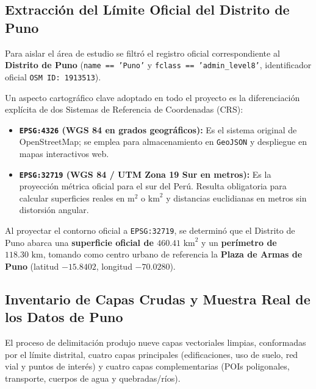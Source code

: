 \documentclass[11pt,a4paper]{article}
\begin{document}
\subsection{Extracción del Límite Oficial del Distrito de Puno}

Para aislar el área de estudio se filtró el registro oficial correspondiente al \textbf{Distrito de Puno} (\texttt{name == 'Puno'} y \texttt{fclass == 'admin\_level8'}, identificador oficial \texttt{OSM ID: 1913513}).

Un aspecto cartográfico clave adoptado en todo el proyecto es la diferenciación explícita de dos Sistemas de Referencia de Coordenadas (CRS):
\begin{itemize}[leftmargin=0.8cm, itemsep=2pt]
    \item \textbf{\texttt{EPSG:4326} (WGS 84 en grados geográficos):} Es el sistema original de OpenStreetMap; se emplea para almacenamiento en \texttt{GeoJSON} y despliegue en mapas interactivos web.
    \item \textbf{\texttt{EPSG:32719} (WGS 84 / UTM Zona 19 Sur en metros):} Es la proyección métrica oficial para el sur del Perú. Resulta obligatoria para calcular superficies reales en $\text{m}^2$ o $\text{km}^2$ y distancias euclidianas en metros sin distorsión angular.
\end{itemize}

Al proyectar el contorno oficial a \texttt{EPSG:32719}, se determinó que el Distrito de Puno abarca una \textbf{superficie oficial de $460.41\text{ km}^2$} y un \textbf{perímetro de $118.30\text{ km}$}, tomando como centro urbano de referencia la \textbf{Plaza de Armas de Puno} (latitud $-15.8402$, longitud $-70.0280$).


\subsection{Inventario de Capas Crudas y Muestra Real de los Datos de Puno}

El proceso de delimitación produjo nueve capas vectoriales limpias, conformadas por el límite distrital, cuatro capas principales (edificaciones, uso de suelo, red vial y puntos de interés) y cuatro capas complementarias (POIs poligonales, transporte, cuerpos de agua y quebradas/ríos).
\end{document}
